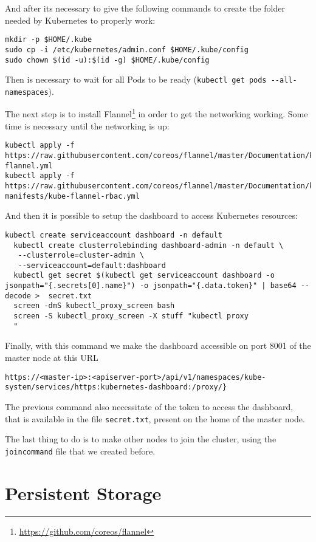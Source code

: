 And after its necessary to give the following commands to create the folder 
needed by Kubernetes to properly work:
\begin{lstlisting}
mkdir -p $HOME/.kube
sudo cp -i /etc/kubernetes/admin.conf $HOME/.kube/config
sudo chown $(id -u):$(id -g) $HOME/.kube/config
\end{lstlisting}

Then is necessary to wait for all Pods to be ready
(\texttt{kubectl\ get\ pods\ -\/-all-namespaces}).

The next step is to install 
Flannel\footnote{\url{https://github.com/coreos/flannel}}
in order to get the networking working. Some time is necessary until the 
networking is up:
\begin{lstlisting}
kubectl apply -f https://raw.githubusercontent.com/coreos/flannel/master/Documentation/kube-flannel.yml
kubectl apply -f https://raw.githubusercontent.com/coreos/flannel/master/Documentation/k8s-manifests/kube-flannel-rbac.yml
\end{lstlisting}

And then it is possible to setup the dashboard to access Kubernetes resources:
\begin{lstlisting}
kubectl create serviceaccount dashboard -n default
  kubectl create clusterrolebinding dashboard-admin -n default \
   --clusterrole=cluster-admin \
   --serviceaccount=default:dashboard
  kubectl get secret $(kubectl get serviceaccount dashboard -o jsonpath="{.secrets[0].name}") -o jsonpath="{.data.token}" | base64 --decode >  secret.txt
  screen -dmS kubectl_proxy_screen bash
  screen -S kubectl_proxy_screen -X stuff "kubectl proxy
  "
\end{lstlisting}

Finally, with this command we make the dashboard accessible on port 8001 of the 
master node at this URL
\begin{verbatim}
https://<master-ip>:<apiserver-port>/api/v1/namespaces/kube-system/services/https:kubernetes-dashboard:/proxy/}
\end{verbatim}

The previous command also necessitate of the token to access the dashboard, 
that is available in the file \texttt{secret.txt}, present on the home of the 
master node.

The last thing to do is to make other nodes to join the cluster, using the
\texttt{joincommand} file that we created before.

\section{Persistent Storage}
\label{persistent-storage}

